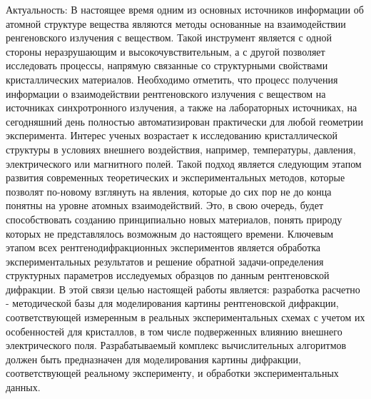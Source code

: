 
Актуальность:
  В настоящее время одним из основных источников информации об атомной структуре
  вещества являются методы основанные на взаимодействии ренгеновского излучения с веществом.
  Такой инструмент является с одной стороны неразрушающим и высокочувствительным,
   а с другой позволяет исследовать процессы, напрямую связанные со структурными
   свойствами кристаллических материалов. Необходимо отметить, что процесс
   получения информации о взаимодействии рентгеновского излучения с веществом на
   источниках синхротронного излучения, а также на лабораторных источниках, на
   сегодняшний день полностью автоматизирован практически для любой геометрии эксперимента.
    Интерес ученых возрастает к исследованию кристаллической структуры в условиях
     внешнего воздействия, например, температуры, давления, электрического или
     магнитного полей.  Такой подход является следующим этапом развития современных
     теоретических и экспериментальных методов, которые позволят по-новому взглянуть на
     явления, которые до сих пор не до конца понятны на уровне атомных взаимодействий.
      Это, в свою очередь, будет способствовать созданию принципиально новых материалов,
       понять природу которых не представлялось возможным до настоящего времени. Ключевым
       этапом всех рентгенодифракционных экспериментов является обработка экспериментальных
       результатов и решение обратной задачи-определения структурных параметров
       исследуемых образцов по данным рентгеновской дифракции. В этой связи целью
       настоящей работы является:
  разработка расчетно - методической базы для моделирования картины рентгеновской
  дифракции, соответствующей измеренным в реальных экспериментальных схемах
  с учетом их особенностей для кристаллов, в том числе подверженных влиянию
  внешнего электрического поля. Разрабатываемый комплекс вычислительных алгоритмов
  должен быть предназначен
  для моделирования картины дифракции, соответствующей реальному эксперименту,
  и обработки экспериментальных данных.

